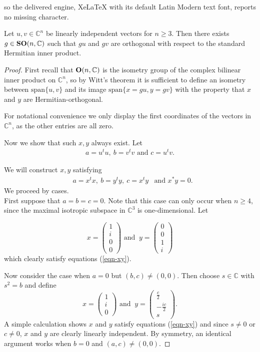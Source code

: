 \documentclass[10pt,a4paper]{amsart}
\def \OC#1{\text{\bf O}(#1,\cn)}
\def \SOC#1{\text{\bf SO}(#1,\cn)}
\def \cn{{\mathbb C}}
\begin{document}
so the delivered engine, XeLaTeX with its default Latin Modern text font, reports no missing character.
\begin{lemma}\label{lemma-zeros-sonC}
	Let $u,v \in \mathbb{C}^n$ be linearly independent vectors for $n \geq 3$. Then there exists $g \in \SOC{n}$ such that $gu$ and $gv$ are orthogonal with respect to the standard Hermitian inner product.\end{lemma} 

\begin{proof}
	First recall that $\OC{n}$ is the isometry group of the complex bilinear inner product on $\cn^n$, so by Witt's theorem it is sufficient to define an isometry between $\text{span}\{u,v\}$ and its image $\text{span}\{x=gu,y=gv\}$ with the property that $x$ and $y$ are Hermitian-orthogonal.	
	
	 For notational convenience we only display the first coordinates of the vectors in $\cn^n$, as the other entries are all zero.
	 
	Now we show that such $x,y$ always exist. Let 
	\begin{eqnarray*}
		&a = u^t u, \ b = v^t v \text{ and } c = u^t v.&
	\end{eqnarray*}
	
	We will construct $x,y$ satisfying
	\begin{eqnarray}\label{eqn-xy}
		&a = x^t x, \ b = y^t y, \ c = x^t y& \text{and } x^*y=0.
	\end{eqnarray}
	We proceed by cases. \\

	
	First suppose that $a = b =c = 0$. Note that this case can only occur when $n \geq 4$, since the maximal isotropic subspace in $\cn^3$ is one-dimensional. Let

$$ x = \begin{pmatrix}
		1 \\ i \\ 0 \\ 0
	\end{pmatrix} \text{ and }  \ y = \begin{pmatrix}
		0 \\ 0 \\ 1 \\ i
	\end{pmatrix}$$
	which clearly satisfy equations (\ref{eqn-xy}).
	
	Now consider the case when $a = 0$ but $(b,c) \neq (0,0)$. Then choose $s \in \cn$ with $s^2=b$ and define
	$$ x = \begin{pmatrix}
		1 \\ i \\ 0
	\end{pmatrix} \text{ and }  \ y = \begin{pmatrix}
		\tfrac{c}{2} \\ -\tfrac{ic}{2}\\ s
	\end{pmatrix}.$$
A simple calculation shows $x$ and $y$ satisfy equations (\ref{eqn-xy}) and since $s \neq 0$ or $c \neq 0$, $x$ and $y$ are clearly linearly independent. By symmetry, an identical argument works when $b=0$ and $(a,c) \neq (0,0)$.


\end{proof}
\end{document}
